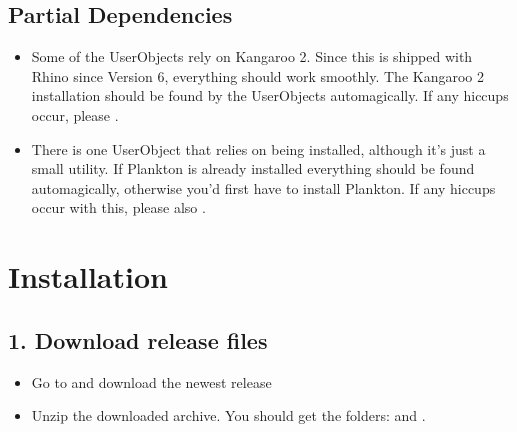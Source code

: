 \documentclass[letterpaper,10pt,english]{sphinxmanual}
\begin{document}
\subsection{Partial Dependencies}
\label{\detokenize{README:partial-dependencies}}\begin{itemize}
\item {} 
Some of the UserObjects rely on Kangaroo 2. Since this is shipped
with Rhino since Version 6, everything should work smoothly. The
Kangaroo 2 installation should be found by the UserObjects
automagically. If any hiccups occur, please .

\item {} 
There is one UserObject that relies on
 being installed,
although it’s just a small utility. If Plankton is already installed
everything should be found automagically, otherwise you’d first have
to install Plankton. If any hiccups occur with this, please also .

\end{itemize}


\section{Installation}
\label{\detokenize{README:installation}}

\subsection{1. Download release files}
\label{\detokenize{README:download-release-files}}\label{\detokenize{README:id2}}\begin{itemize}
\item {} 
Go to  and
download the newest release

\item {} 
Unzip the downloaded archive. You should get the folders: 
and .

\end{itemize}
\end{document}
